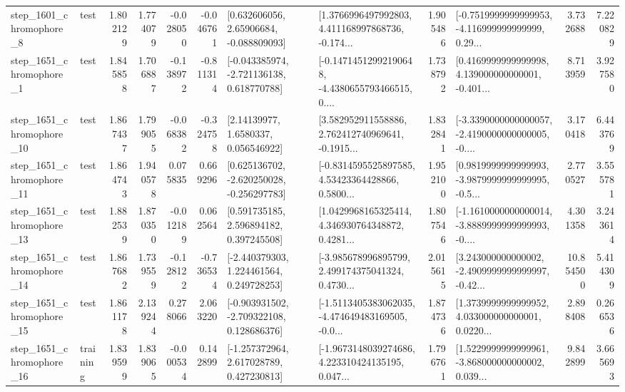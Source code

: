 \begin{tabular}{llrrrrllrlrr}
  step\_1601\_chromophore\_8 &      test &      1.802129 &    1.774079 &     -0.028050 & -0.046761 &     [0.632606056, 2.65906684, -0.088809093] &  [1.3766996497992803, 4.411168997868736, -0.174... &       1.905486 &  [-0.7519999999999953, -4.116999999999999, 0.29... &            3.732688 &          7.220829 \\
  step\_1651\_chromophore\_1 &      test &      1.845858 &    1.706887 &     -0.138972 & -0.811314 &   [-0.043385974, -2.721136138, 0.618770788] &  [-0.14714512992190648, -4.4380655793466515, 0.... &       1.738792 &  [0.4169999999999998, 4.139000000000001, -0.401... &            8.713959 &          3.927580 \\
 step\_1651\_chromophore\_10 &      test &      1.867437 &    1.799055 &     -0.068382 & -0.324758 &        [2.14139977, 1.6580337, 0.056546922] &  [3.582952911558886, 2.762412740969641, -0.1915... &       1.832841 &  [-3.3390000000000057, -2.4190000000000005, -0.... &            3.170418 &          6.443769 \\
 step\_1651\_chromophore\_11 &      test &      1.864743 &    1.940578 &      0.075835 &  0.669296 &   [0.625136702, -2.620250028, -0.256297783] &  [-0.8314595525897585, 4.53423364428866, 0.5800... &       1.952100 &  [0.9819999999999993, -3.9879999999999995, -0.5... &            2.770527 &          3.555781 \\
 step\_1651\_chromophore\_13 &      test &      1.882539 &    1.870350 &     -0.012189 &  0.062564 &     [0.591735185, 2.596894182, 0.397245508] &  [1.0429968165325414, 4.346930764348872, 0.4281... &       1.807546 &  [-1.1610000000000014, -3.8889999999999993, -0.... &            4.301358 &          3.243614 \\
 step\_1651\_chromophore\_14 &      test &      1.867682 &    1.739559 &     -0.128122 & -0.736534 &    [-2.440379303, 1.224461564, 0.249728253] &  [-3.985678996895799, 2.499174375041324, 0.4730... &       2.015615 &  [3.243000000000002, -2.4909999999999997, -0.42... &           10.854500 &          5.414309 \\
 step\_1651\_chromophore\_15 &      test &      1.861178 &    2.139244 &      0.278066 &  2.063220 &   [-0.903931502, -2.709322108, 0.128686376] &  [-1.5113405383062035, -4.474649483169505, -0.0... &       1.874736 &  [1.3739999999999952, 4.033000000000001, 0.0220... &            2.898408 &          0.266536 \\
 step\_1651\_chromophore\_16 &  training &      1.839599 &    1.839065 &     -0.000534 &  0.142899 &    [-1.257372964, 2.617028789, 0.427230813] &  [-1.9673148039274686, 4.223310424135195, 0.047... &       1.796761 &  [1.5229999999999961, -3.868000000000002, 0.039... &            9.842899 &          3.665693 \\

\end{tabular}
